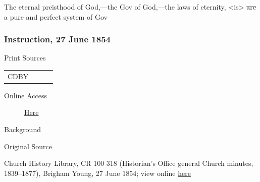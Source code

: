 					The eternal preisthood of God,---the Gov of God,---the laws of eternity, <is> \sout{are} a pure and perfect system of Gov
		
		\subsubsection{Instruction, 27 June 1854}
			\label{EMS-1854-BY-27-JUN-1854}
			
			\begin{description}
					\item[Print Sources]
				\end{description}

					\begin{tabular}{p{0.5in}p{1in}p{0.5in}p{1in}}
					CDBY	& 		&  		&  \\
					\end{tabular}
				
				\begin{description}
					\item[Online Access] \href{https://catalog.churchofjesuschrist.org/assets/1dc08736-40cc-4a4d-86be-759370da1731/0/0}{Here}
				\end{description}
				
				\begin{description}
					\item[Background]
				\end{description}
				
					\phantom{.}
				
				\begin{description}
					\item[Original Source]
				\end{description}
				
					Church History Library, CR 100 318 (Historian's Office general Church minutes, 1839--1877), Brigham Young, 27 June 1854; view online \href{https://catalog.churchofjesuschrist.org/assets/1dc08736-40cc-4a4d-86be-759370da1731/0/0}{here}
				
